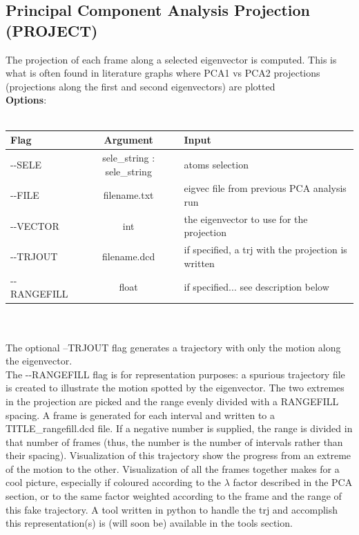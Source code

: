\documentclass[11pt,twoside,onecolumn,a4paper,openright,notitlepage]{book}[2001/04/21]
\begin{document}
\subsection{Principal Component Analysis Projection (PROJECT)}
The projection of each frame along a selected eigenvector is computed. This is what is often found in literature graphs where PCA1 vs PCA2 projections (projections along the first and second eigenvectors) are plotted\\

\textbf{\large Options}:\\\\
\begin{tabular}{l|c|p{7.0cm}}
Flag & Argument & Input \\
\hline
-{}-SELE          & sele\_string : sele\_string   & atoms selection\\
-{}-FILE          & filename.txt  & eigvec file from previous PCA analysis run\\
-{}-VECTOR        & int           & the eigenvector to use for the projection\\
-{}-TRJOUT        & filename.dcd  & if specified, a trj with the projection is written\\
-{}-RANGEFILL     & float         & if specified... see description below\\
\end{tabular}\\\\

The optional --TRJOUT flag generates a trajectory with only the motion along the eigenvector.\\
The -{}-RANGEFILL flag is for representation purposes: a spurious trajectory file is created to illustrate the motion spotted by the eigenvector. The two extremes in the projection are picked and the range evenly divided with a RANGEFILL spacing. A frame is generated for each interval and written to a TITLE\_rangefill.dcd file. If a negative number is supplied, the range is divided in that number of frames (thus, the number is the number of intervals rather than their spacing). Visualization of this trajectory show the progress from an extreme of the motion to the other. Visualization of all the frames together makes for a cool picture, especially if coloured according to the $\lambda$ factor described in the PCA section, or to the same factor weighted according to the frame and the range of this fake trajectory. A tool written in python to handle the trj and accomplish this representation(s) is (will soon be) available in the tools section.\\
\end{document}
